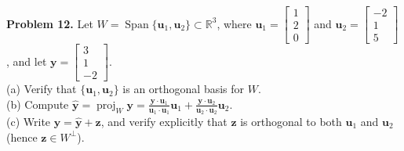 \documentclass[11pt, letterpaper]{article}
\theoremstyle{definition}
\theoremstyle{remark}
\begin{document}
\textbf{Problem 12.} Let $W = \operatorname{Span}\{\mathbf{u}_1, \mathbf{u}_2\} \subset \mathbb{R}^3$, where $\mathbf{u}_1 = \begin{bmatrix} 1 \\ 2 \\ 0 \end{bmatrix}$ and $\mathbf{u}_2 = \begin{bmatrix} -2 \\ 1 \\ 5 \end{bmatrix}$, and let $\mathbf{y} = \begin{bmatrix} 3 \\ 1 \\ -2 \end{bmatrix}$. \\
(a) Verify that $\{\mathbf{u}_1, \mathbf{u}_2\}$ is an orthogonal basis for $W$. \\
(b) Compute $\hat{\mathbf{y}} = \operatorname{proj}_W \mathbf{y} = \frac{\mathbf{y} \cdot \mathbf{u}_1}{\mathbf{u}_1 \cdot \mathbf{u}_1}\mathbf{u}_1 + \frac{\mathbf{y} \cdot \mathbf{u}_2}{\mathbf{u}_2 \cdot \mathbf{u}_2}\mathbf{u}_2$. \\
(c) Write $\mathbf{y} = \hat{\mathbf{y}} + \mathbf{z}$, and verify explicitly that $\mathbf{z}$ is orthogonal to both $\mathbf{u}_1$ and $\mathbf{u}_2$ (hence $\mathbf{z} \in W^\perp$).
\end{document}
